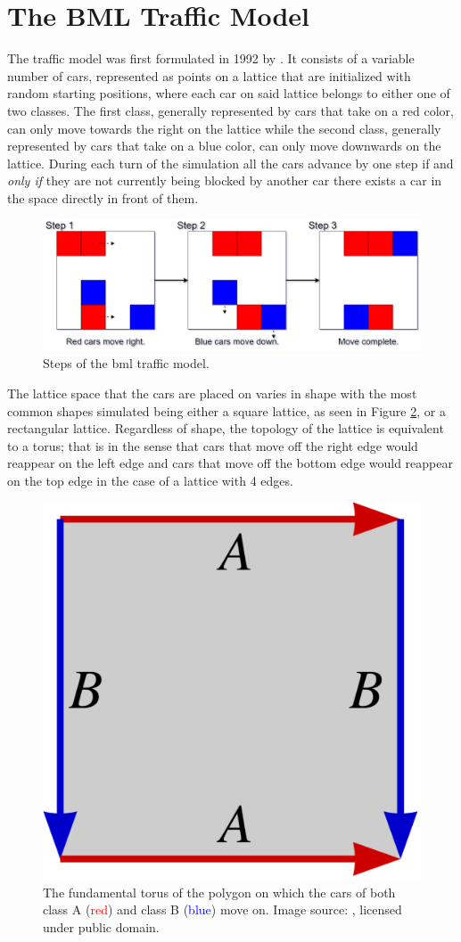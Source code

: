 \section{The BML Traffic Model}
\label{sec:The-BML-Traffic-Model}
The  traffic model was first formulated in 1992 by \citet{Biham}. It consists of a variable number of cars, represented as points on a lattice that are initialized with random starting positions, where each car on said lattice belongs to either one of two classes. The first class, generally represented by cars that take on a red color, can only move towards the right on the lattice while the second class, generally represented by cars that take on a blue color, can only move downwards on the lattice. During each turn of the simulation all the cars advance by one step if and \textit{only if} they are not currently being blocked by another car \ie there exists a car  in the space directly in front of them.

\begin{figure}[htb!]
    \centering
    \includegraphics[width=\linewidth]{Images/Section 2/BML Step.pdf}
    \caption{Steps of the \gls{bml} traffic model.}
    \label{fig:BML-Step}
\end{figure}

\noindent The lattice space that the cars are placed on varies in shape with the most common shapes simulated being either a square lattice, as seen in Figure \ref{fig:BML-Torus}, or a rectangular lattice. Regardless of shape, the topology of the lattice is equivalent to a torus; that is in the sense that cars that move off the right edge would reappear on the left edge and cars that move off the bottom edge would reappear on the top edge in the case of a lattice with 4 edges.

\begin{figure}[htb!]
    \centering
    \includegraphics[width=0.25\linewidth]{Images/Section 2/BML Torus.pdf}
    \caption{The fundamental torus of the polygon on which the cars of both class A (\textcolor{red}{red}) and class B (\textcolor{blue}{blue}) move on. Image source: \cite{Wikipedia_Torus}, licensed under public domain.}
    \label{fig:BML-Torus}
\end{figure}

